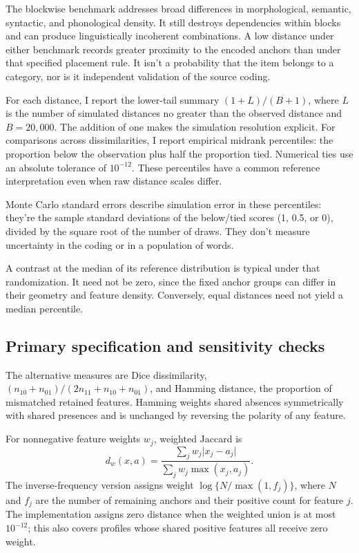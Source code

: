 \documentclass[12pt]{article}
\begin{document}
The blockwise benchmark addresses broad differences in morphological, semantic, syntactic, and phonological density. It still destroys dependencies within blocks and can produce linguistically incoherent combinations. A low distance under either benchmark records greater proximity to the encoded anchors than under that specified placement rule. It isn't a probability that the item belongs to a category, nor is it independent validation of the source coding.

For each distance, I report the lower-tail summary $(1+L)/(B+1)$, where $L$ is the number of simulated distances no greater than the observed distance and $B=20{,}000$. The addition of one makes the simulation resolution explicit. For comparisons across dissimilarities, I report empirical midrank percentiles: the proportion below the observation plus half the proportion tied. Numerical ties use an absolute tolerance of $10^{-12}$. These percentiles have a common reference interpretation even when raw distance scales differ.

Monte Carlo standard errors describe simulation error in these percentiles: they're the sample standard deviations of the below/tied scores (1, 0.5, or 0), divided by the square root of the number of draws. They don't measure uncertainty in the coding or in a population of words.

A contrast at the median of its reference distribution is typical under that randomization. It need not be zero, since the fixed anchor groups can differ in their geometry and feature density. Conversely, equal distances need not yield a median percentile.

\subsection{Primary specification and sensitivity checks}

The alternative measures are Dice dissimilarity, $ (n_{10}+n_{01})/(2n_{11}+n_{10}+n_{01})$, and Hamming distance, the proportion of mismatched retained features. Hamming weights shared absences symmetrically with shared presences and is unchanged by reversing the polarity of any feature.

For nonnegative feature weights $w_j$, weighted Jaccard is
\[
 d_w(x,a)=\frac{\sum_j w_j\lvert x_j-a_j\rvert}{\sum_j w_j\max(x_j,a_j)}.
\]
The inverse-frequency version assigns weight $\log\{N/\max(1,f_j)\}$, where $N$ and $f_j$ are the number of remaining anchors and their positive count for feature $j$. The implementation assigns zero distance when the weighted union is at most $10^{-12}$; this also covers profiles whose shared positive features all receive zero weight.
\end{document}
